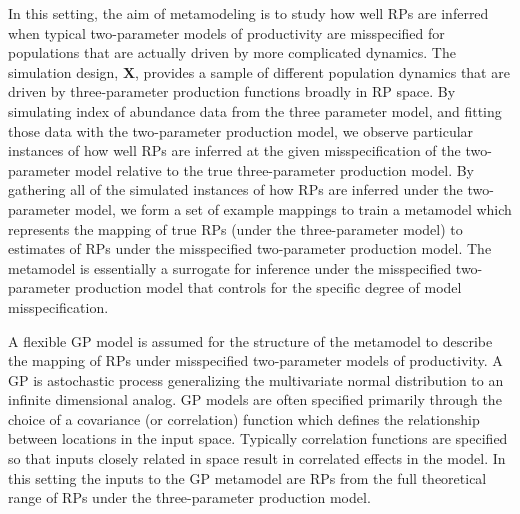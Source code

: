 %
In this setting, the aim of metamodeling is to study how well RPs are inferred
when typical two-parameter models of productivity %
are misspecified for populations that are actually driven by more 
complicated dynamics. The simulation design, $\bm{X}$, provides a sample of 
different population dynamics that are driven by three-parameter production 
functions broadly in RP space. By simulating index of abundance data from the 
three parameter model, and fitting those data with the two-parameter production model, we %
observe particular instances of how well RPs are inferred at the given
misspecification of the two-parameter model relative to the true three-parameter
production model. By gathering all of the simulated instances of how RPs are
inferred under the two-parameter model, %
we form a set of example mappings to train a metamodel which represents the
mapping of true RPs (under the three-parameter model) to estimates of RPs under the
misspecified two-parameter production model. The metamodel is essentially a surrogate
for inference under the misspecified two-parameter production model that
controls for the specific degree of model misspecification.

%
A flexible GP model is assumed for the structure of the metamodel to describe 
the mapping of RPs under misspecified two-parameter models of productivity. A 
GP is astochastic process generalizing the multivariate normal distribution to 
an infinite dimensional analog. GP models are often specified primarily
through the choice of a covariance (or correlation) function which defines the
relationship between locations in the input space. %
Typically correlation functions are specified so that inputs closely related in
space result in correlated effects in the model. In this setting the inputs to
the GP metamodel are RPs from the full theoretical range of RPs under the 
three-parameter production model. 

